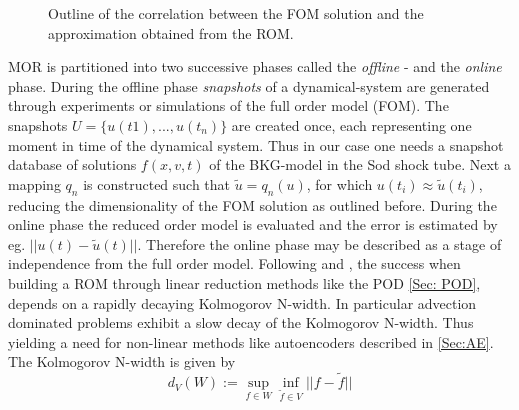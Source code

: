 \begin{figure}[H]
	\begin{subfigure}{.45\textwidth}
		\centering
		
	\end{subfigure}\hfill
	\begin{subfigure}{.45\textwidth}
		\centering
		
	\end{subfigure}
	\caption{Outline of the correlation between the FOM solution and the approximation obtained from the ROM.}
\end{figure}
MOR is partitioned into two successive phases called the \textit{offline} - and the \textit{online} phase. During the offline phase \textit{snapshots} of a dynamical-system are generated through experiments or simulations of the full order model (FOM). The snapshots \(U = \{u(t1),...,u(t_n)\}\) are created once, each representing one moment in time of the dynamical system. Thus in our case one needs a snapshot database of solutions \(f(x,v,t)\) of the BKG-model in the Sod shock tube. Next a mapping \(q_n\) is constructed such that \(\tilde{u} = q_n(u)\), for which \(u(t_i) \approx \tilde{u}(t_i)\), reducing the dimensionality of the FOM solution as outlined before. During the online phase the reduced order model is evaluated and the error is estimated by eg. \(||u(t) - \tilde{u}(t)||\). Therefore the online phase may be described as a stage of independence from the full order model.
Following \cite{ohlberger2015reduced} and \cite{Carlberg}, the success when building a ROM through linear reduction methods like the POD \cref{Sec: POD}, depends on a rapidly decaying Kolmogorov N-width. In particular advection dominated problems exhibit a slow decay of the Kolmogorov N-width. Thus yielding a need for non-linear methods like autoencoders described in \cref{Sec:AE}. The Kolmogorov N-width is given by
\begin{equation}
	d_{V}(W):= \sup_{f \in W} \inf_{\tilde{f} \in V} ||f-\tilde{f}||
\end{equation}
